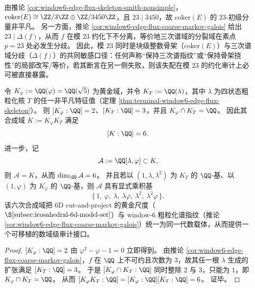 \begin{remark}\label{rem:window6-common-singular-prime-23}
由推论 \ref{cor:window6-edge-flux-skeleton-smith-nonsimple}，
\(\mathrm{coker}(E)\cong \ZZ/3\ZZ\oplus \ZZ/3450\ZZ\)，且 \(23\mid 3450\)，故 \(\mathrm{coker}(E)\) 的 \(23\)-初级分量非平凡。
另一方面，推论 \ref{cor:window6-edge-flux-coarse-markov-galois} 给出 \(23\mid \Delta(f)\)，从而 \(f\) 在模 \(23\) 约化下不分离，等价地三次谱域的分裂域在素点 \(p=23\) 处必发生分歧。
因此，模 \(23\) 同时是块级整数骨架（\(\mathrm{coker}(E)\)）与三次谱域分歧（\(\Delta(f)\)）的共同敏感口径：任何声称“保持三次谱指纹”或“保持骨架挠性”的局部改写/等价，若其断言在另一侧失败，则该失配在模 \(23\) 的约化审计上必可被直接暴露。
\end{remark}

\begin{corollary}\label{cor:window6-golden-cubic-audit-field-degree6}
令 \(K_\varphi:=\QQ(\varphi)=\QQ(\sqrt5)\) 为黄金域，并令 \(K_T:=\QQ(\lambda)\)，其中 \(\lambda\) 为四状态粗粒化核 \(T\) 的任一非平凡特征值（定理 \ref{thm:terminal-window6-edge-flux-skeleton}）。
则 \([K_\varphi:\QQ]=2\)、\([K_T:\QQ]=3\)，并且 \(K_\varphi\cap K_T=\QQ\)。
因此其合成域 \(K:=K_\varphi K_T\) 满足
\[
[K:\QQ]=6.
\]
进一步，记
\[
\mathcal A:=\QQ[\lambda,\varphi]\subset K,
\]
则 \(\mathcal A=K\)，从而 \(\dim_{\QQ}\mathcal A=6\)。
并且若以 \((1,\lambda,\lambda^2)\) 为 \(K_T\) 的 \(\QQ\)-基、以 \((1,\varphi)\) 为 \(K_\varphi\) 的 \(\QQ\)-基，则 \(\mathcal A\) 具有显式乘积基
\[
\{\,1,\ \varphi,\ \lambda,\ \lambda\varphi,\ \lambda^2,\ \lambda^2\varphi\,\}.
\]
该六次合成域把 6D cut-and-project 的黄金尺度（\(\S\ref{subsec:icosahedral-6d-model-set}\)）与 window-\(6\) 粗粒化谱指纹（推论 \ref{cor:window6-edge-flux-coarse-markov-galois}）统一为同一代数载体，从而提供一个可移植的数域级审计接口。
\end{corollary}
\begin{proof}
\([K_\varphi:\QQ]=2\) 由 \(\varphi^2-\varphi-1=0\) 立即得到。
由推论 \ref{cor:window6-edge-flux-coarse-markov-galois}，\(f\) 在 \(\QQ\) 上不可约且次数为 \(3\)，故其任一根 \(\lambda\) 生成的扩张满足 \([K_T:\QQ]=3\)。
于是 \([K_\varphi\cap K_T:\QQ]\) 同时整除 \(2\) 与 \(3\)，只能为 \(1\)，即 \(K_\varphi\cap K_T=\QQ\)。
从而
\(
[K_\varphi K_T:\QQ]=[K_\varphi:\QQ][K_T:\QQ]=6
\)。
证毕。
\end{proof}

